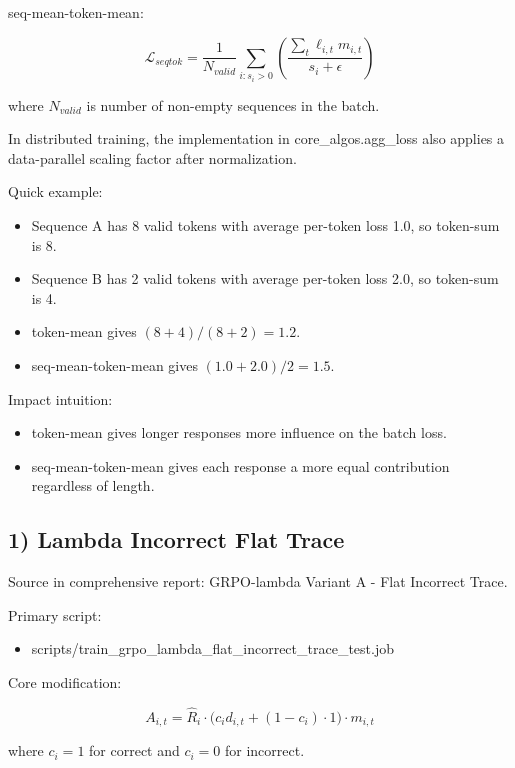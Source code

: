 \documentclass[
]{article}
\providecommand{\tightlist}{%
  \setlength{\itemsep}{0pt}\setlength{\parskip}{0pt}}
\begin{document}
seq-mean-token-mean:

\[
\mathcal{L}_{seqtok} = \frac{1}{N_{valid}}\sum_{i:s_i>0}\left(\frac{\sum_t \ell_{i,t} m_{i,t}}{s_i + \epsilon}\right)
\]

where \(N_{valid}\) is number of non-empty sequences in the batch.

In distributed training, the implementation in core\_algos.agg\_loss
also applies a data-parallel scaling factor after normalization.

Quick example:

\begin{itemize}
\tightlist
\item
  Sequence A has 8 valid tokens with average per-token loss 1.0, so
  token-sum is 8.
\item
  Sequence B has 2 valid tokens with average per-token loss 2.0, so
  token-sum is 4.
\item
  token-mean gives \((8+4)/(8+2)=1.2\).
\item
  seq-mean-token-mean gives \((1.0+2.0)/2=1.5\).
\end{itemize}

Impact intuition:

\begin{itemize}
\tightlist
\item
  token-mean gives longer responses more influence on the batch loss.
\item
  seq-mean-token-mean gives each response a more equal contribution
  regardless of length.
\end{itemize}

\subsection{1) Lambda Incorrect Flat
Trace}\label{lambda-incorrect-flat-trace}

Source in comprehensive report: GRPO-lambda Variant A - Flat Incorrect
Trace.

Primary script:

\begin{itemize}
\tightlist
\item
  scripts/train\_grpo\_lambda\_flat\_incorrect\_trace\_test.job
\end{itemize}

Core modification:

\[
A_{i,t} = \hat{R}_i \cdot \big(c_i d_{i,t} + (1-c_i)\cdot 1\big) \cdot m_{i,t}
\]

where \(c_i=1\) for correct and \(c_i=0\) for incorrect.
\end{document}
